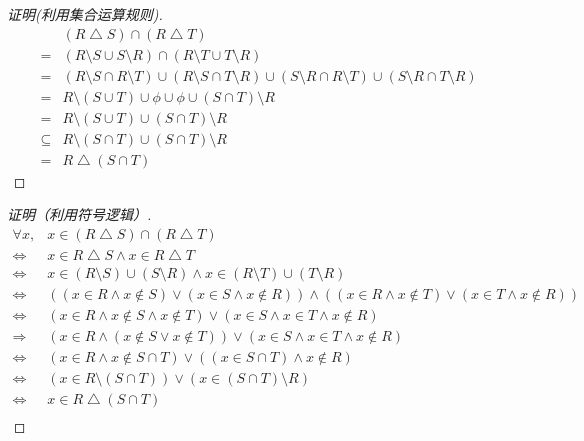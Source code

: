 \documentclass{article}
\begin{document}
\begin{CJK}{UTF8}{gbsn}
\begin{proof}[证明(利用集合运算规则)]
  \begin{equation*}
    \begin{split}
  &(R\bigtriangleup S)\cap (R\bigtriangleup T)\\
  =&(R\setminus S \cup S\setminus R) \cap (R\setminus T \cup T\setminus R)\\
  =&(R\setminus S \cap R\setminus T)\cup (R\setminus S\cap T\setminus R)\cup (S\setminus R\cap R\setminus T)\cup (S\setminus R\cap T\setminus R)\\
  =&R\setminus (S\cup T)\cup \phi \cup \phi \cup (S\cap T)\setminus R\\
  =&R\setminus (S\cup T)\cup  (S\cap T)\setminus R\\
  \subseteq &R\setminus (S\cap T) \cup (S\cap T)\setminus R\\
  =&R\bigtriangleup (S\cap T)
\end{split}
\end{equation*}
\end{proof}
\begin{proof}[证明（利用符号逻辑）]
    \begin{equation*}
    \begin{split}
      \forall x, &x \in (R\bigtriangleup S)\cap (R\bigtriangleup T) \\
      \Leftrightarrow& x \in R\bigtriangleup S \land x\in R\bigtriangleup T\\
      \Leftrightarrow& x \in (R\setminus S)\cup (S\setminus R) \land x\in (R\setminus T)\cup (T\setminus R)\\
      \Leftrightarrow& ((x \in R \land x\notin S) \lor (x \in S \land x \notin R))\land ((x\in R \land x\notin T)\lor (x\in T \land x \notin R))\\
      \Leftrightarrow& (x \in R \land x \notin S  \land x\notin T) \lor (x \in S \land x \in T \land x\notin R)\\
      \Rightarrow & (x \in R \land (x\notin S \lor x\notin T)) \lor (x \in S \land x \in T \land x\notin R)\\
      \Leftrightarrow& (x \in R \land x \notin S\cap T)\lor ((x\in S\cap T)\land x\notin R)\\
      \Leftrightarrow& (x \in R  \setminus (S\cap T))\lor (x\in (S\cap T)\setminus R)\\
      \Leftrightarrow& x \in R  \bigtriangleup (S\cap T)\\      
    \end{split}
  \end{equation*}


\end{proof}
\end{CJK}
\end{document}
